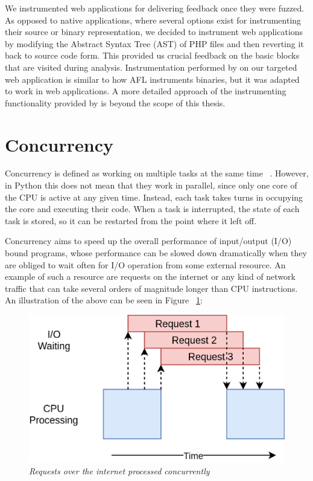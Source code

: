 We instrumented web applications for delivering feedback once they were fuzzed. As opposed to native applications, where several options exist for instrumenting their source or binary
representation, we decided to instrument web applications by modifying the Abstract Syntax Tree (AST) of PHP files and then reverting it back to source code form. This provided us crucial feedback on the basic blocks that are visited during analysis. Instrumentation performed by \pname on our targeted web application is similar to how AFL instruments binaries, but it was adapted to work in web applications. A more detailed approach of the instrumenting functionality provided by \pname is beyond the scope of this thesis.

\section{Concurrency}
Concurrency is defined as working on multiple tasks at the same time ~\cite{concurrency_realpython}. However, in Python this does not mean that they work in parallel, since only one core of the CPU is active at any given time. Instead, each task takes turns in occupying the core and executing their code. When a task is interrupted, the state of each task is stored, so it can be restarted from the point where it left off. 

Concurrency aims to speed up the overall performance of input/output (I/O) bound programs, whose performance can be slowed down dramatically when they are obliged to wait often for I/O operation from some external resource. An example of such a resource are requests on the internet or any kind of network traffic that can take several orders of magnitude longer than CPU instructions. An illustration of the above can be seen in Figure ~\ref{fig:concurrency_example}:

\begin{figure}[ht]
 \centering
 \includegraphics[width=\linewidth]{figures/concurrency_example.png}
 \caption{\textit{Requests over the internet processed concurrently} ~\cite{concurrency_realpython}}
 \label{fig:concurrency_example}
\end{figure}

